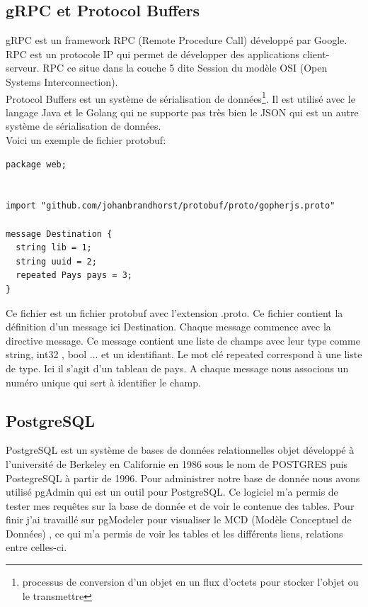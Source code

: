 \documentclass[12pt,a4paper]{report}
\begin{document}
\subsection{gRPC et Protocol Buffers}
gRPC est un framework RPC (Remote Procedure Call) développé par Google. RPC est un protocole IP qui permet de développer des applications client-serveur. RPC ce situe dans la couche 5 dite Session du modèle OSI (Open Systems Interconnection).\\

Protocol Buffers est un système de sérialisation de données\footnote{processus de conversion d'un objet en un flux d'octets pour stocker l'objet ou le transmettre}. Il est utilisé  avec le langage Java et le Golang qui ne supporte pas très bien le JSON qui est un autre système de sérialisation de données.\\


\newpage
Voici un exemple de fichier protobuf:
\lstset{style=Golang}
\begin{lstlisting}
package web;


import "github.com/johanbrandhorst/protobuf/proto/gopherjs.proto"

message Destination {
  string lib = 1;
  string uuid = 2;
  repeated Pays pays = 3;
}
\end{lstlisting}

Ce fichier est un fichier protobuf avec l'extension .proto. Ce fichier contient la définition d'un message ici Destination. Chaque message commence avec la directive message. Ce message contient une liste de champs avec leur type comme string, int32 , bool ... et un identifiant. Le mot clé repeated correspond à une liste de type. Ici il s'agit d'un tableau de pays. A chaque message nous associons un numéro unique qui sert à identifier le champ.
\subsection{PostgreSQL}
PostgreSQL est un système de bases de données relationnelles objet développé à l'université de Berkeley en Californie en 1986 sous le nom de POSTGRES puis PostegreSQL  à partir de 1996. Pour administrer notre base de donnée nous avons  utilisé pgAdmin qui est un outil pour PostgreSQL. Ce logiciel m'a permis de tester mes requêtes sur la base de donnée et de voir le contenue des tables. Pour finir j'ai travaillé sur pgModeler pour visualiser le MCD (Modèle Conceptuel de Données) , ce qui m'a permis de voir les tables et les différents liens, relations entre celles-ci.
\end{document}
